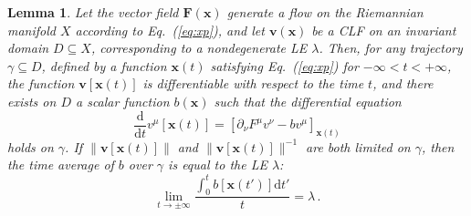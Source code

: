 \documentclass{article}
\theoremstyle{plain}
\newtheorem{lemma}[theorem]{Lemma}
\theoremstyle{definition}
\theoremstyle{remark}
\newcommand{\vect}[1]{\boldsymbol{#1}}
\begin{document}
\begin{lemma}\label{lemma:eq_br}
  Let the vector field $\vect{F}(\vect{x})$ generate a flow on the
  Riemannian manifold $X$ according to Eq.~(\ref{eq:xp}), and let
  $\vect{v}(\vect{x})$ be a CLF on an invariant domain $D\subseteq
  X$, corresponding to a nondegenerate LE $\lambda$.  
Then, for any trajectory $\gamma\subseteq D$, defined by a
  function $\vect{x}(t)$ satisfying Eq.~(\ref{eq:xp}) for
  $-\infty<t<+\infty$, 
the function
  $\vect{v}\left[\vect{x}(t)\right]$ is differentiable with respect to
  the time $t$, and there exists on $D$ a scalar function 
$b(\vect{x})$  such that the differential equation
\begin{equation}
    \frac{\mathrm{d}}{\mathrm{d}t} v^{\mu}[\vect{x}(t)] =
    \left[\partial_\nu F^{\mu} v^{\nu} -    
b v^{\mu}\right]_{\vect{x}(t)}
    \label{eq:traject}
  \end{equation}  
  holds on $\gamma$. 
If $\lVert \vect{v}[\vect{x}(t)]\rVert$ and
$\lVert \vect{v}[\vect{x}(t)]\rVert^{-1}$ are both limited
on $\gamma$,
then the time average of $b$ over $\gamma$ is
  equal to the LE $\lambda$:
  \begin{equation}\label{eq:time_av}
    \lim_{t\to \pm\infty}\frac{\int_0^t b\left[\vect{x}(t')\right]{\mathrm{d}}t'}{t}
    =\lambda \, .
  \end{equation}
\end{lemma}
\end{document}

